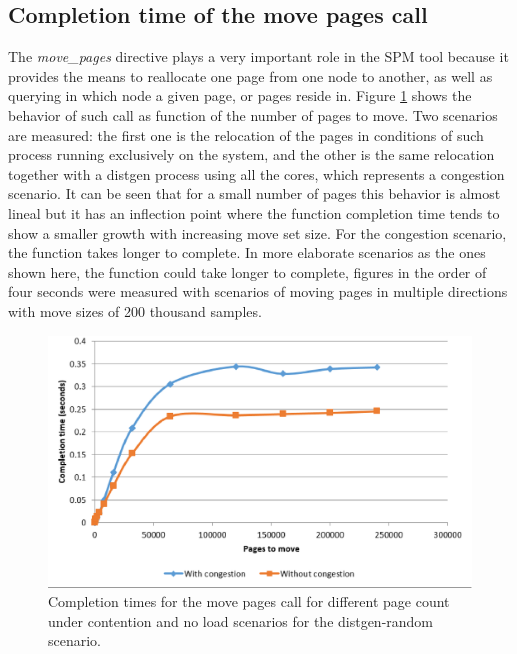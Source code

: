 \subsection{Completion time of the move pages call}\label{subsection:pmu-movpatime}


The \textit{move\_pages} directive plays a very important role in the SPM tool because it provides the means to reallocate one page from one node to another, as well as querying in which node a given page, or pages reside in. Figure \ref{fig:mov-pages-time.eps} shows the behavior of such call as function of the number of pages to move. Two scenarios are measured: the first one is the relocation of the pages in conditions of such process running exclusively on the system, and the other is the same relocation together with a distgen process using all the cores, which represents a congestion scenario. It can be seen that for a small number of pages this behavior is almost lineal but it has an inflection point where the function completion time tends to show a smaller growth with increasing move set size. For the congestion scenario, the function takes longer to complete. In more elaborate scenarios as the ones shown here, the function could take longer to complete, figures in the order of four seconds were measured with scenarios of moving pages in multiple directions with move sizes of 200 thousand samples.

\begin{figure}[th]  
	\centering
		\includegraphics[width=.8\textwidth]{figures/mov-pages-time.eps}
		\caption{Completion times for the move pages call for different page count under contention and no load scenarios for the distgen-random scenario.}
		\label{fig:mov-pages-time.eps}
\end{figure}
